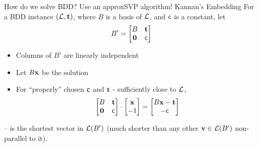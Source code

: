 \documentclass[usenames,dvipsnames, 9pt, aspectratio=169]{beamer}
\begin{document}
\begin{frame}{How do we solve BDD? Use an approxSVP algorithm! Kannan's Embedding }
\LARGE
For a  {\color{Orange} BDD} instance $(\mathcal{L}, \mathbf{t})$, where $B$ is a basis of $\mathcal{L}$, and $\mathsf{c}$ is a constant, let
\[
B' = 
\begin{bmatrix}
B & \mathbf{t} \\
\mathbf{0} & \mathsf{c}
\end{bmatrix}
\]
\begin{itemize}
	\item Columns of $B'$ are linearly independent
	\item Let $B\mathbf{x}$ be the solution 
	\item For  ``properly'' chosen $\mathsf{c}$ and $\mathbf{t}$ - sufficiently close to  $\mathcal{L}$, 
	\[
	\begin{bmatrix}
	B & \mathbf{t} \\
	\mathbf{0} & \mathsf{c}
	\end{bmatrix} \cdot
	\begin{bmatrix}
	\mathbf{x}  \\
	-1
	\end{bmatrix} = 
	\begin{bmatrix}
	B\mathbf{x} - \mathbf{t}  \\
	-\mathsf{c}
	\end{bmatrix}
	\]
\end{itemize}
-- is the shortest vector in $\mathcal{L}(B')$ (much shorter than any other $\mathbf{v} \in \mathcal{L}(B')$ non-parallel to it). 
\end{frame}
\end{document}
